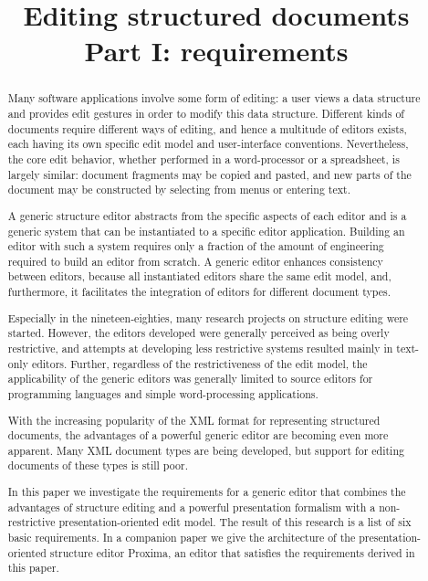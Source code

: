 \documentclass{speauth}
\begin{document}


  \title{Editing structured documents\\ Part I: requirements} 
  \address{Institute of Information and Computing Sciences\\ Utrecht University\\
    Utrecht, The Netherlands}     
\begin{abstract} 
Many software applications involve some form of editing: a user views a data structure and provides edit gestures in order to modify this data structure. Different kinds of documents require different ways of editing, and hence a multitude of editors exists, each having its own specific edit model and user-interface conventions. Nevertheless, the core edit behavior, whether performed in a word-processor or a spreadsheet, is largely similar: document fragments may be copied and pasted, and new parts of the document may be constructed by selecting from menus or entering text. 

A generic structure editor abstracts from the specific aspects of each editor and is a generic system that can be instantiated to a specific editor application. Building an editor with such a system requires only a fraction of the amount of engineering required to build an editor from scratch. 
A generic editor enhances consistency between editors, because all instantiated editors share the same edit model, and, furthermore, it facilitates the integration of editors for different document types.

Especially in the nineteen-eighties, many research projects on structure editing were started. However, the editors developed were generally perceived as being overly restrictive, and attempts at developing less restrictive systems resulted mainly in text-only editors. Further, regardless of the restrictiveness of the edit model, the applicability of the generic editors was generally limited to source editors for programming languages and simple word-processing applications.

With the increasing popularity of the XML format for representing structured documents, the advantages of a powerful generic editor are becoming even more apparent. Many XML document types are being developed, but support for editing documents of these types is still poor. 

In this paper we investigate the requirements for a generic editor that combines the advantages of structure editing and a powerful presentation formalism with a non-restrictive presentation-oriented edit model. The result of this research is a list of six basic requirements. In a companion paper we give the architecture of the presentation-oriented structure editor Proxima, an editor that satisfies  the requirements derived in this paper.
\end{abstract}
\end{document}
